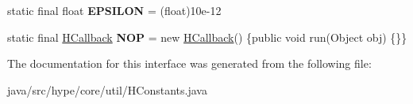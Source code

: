 \begin{DoxyCompactItemize}
\item 
\hypertarget{interfacehype_1_1core_1_1util_1_1_h_constants_af58dd23b7edb42a36cd6cae38a7174bf}{static final float {\bfseries E\-P\-S\-I\-L\-O\-N} = (float)10e-\/12}\label{interfacehype_1_1core_1_1util_1_1_h_constants_af58dd23b7edb42a36cd6cae38a7174bf}

\item 
\hypertarget{interfacehype_1_1core_1_1util_1_1_h_constants_a720a057f61a4ee51f1f09afd8f947a25}{static final \hyperlink{interfacehype_1_1core_1_1interfaces_1_1_h_callback}{H\-Callback} {\bfseries N\-O\-P} = new \hyperlink{interfacehype_1_1core_1_1interfaces_1_1_h_callback}{H\-Callback}() \{public void run(Object obj) \{\}\}}\label{interfacehype_1_1core_1_1util_1_1_h_constants_a720a057f61a4ee51f1f09afd8f947a25}

\end{DoxyCompactItemize}


The documentation for this interface was generated from the following file\-:\begin{DoxyCompactItemize}
\item 
java/src/hype/core/util/H\-Constants.\-java\end{DoxyCompactItemize}
